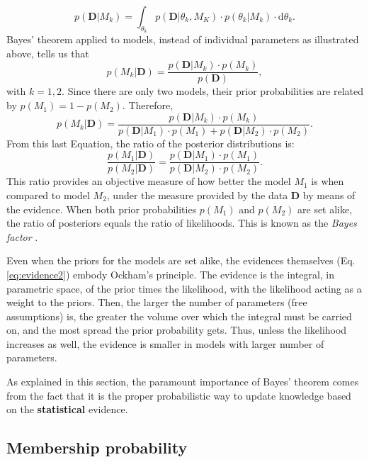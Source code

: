 \begin{equation}
p(\mathbf{D}|M_k)=\int_{\theta_k} p(\mathbf{D}|\theta_k,M_K)\cdot p(\theta_k|M_k)\cdot \mathrm{d}\theta_k. \label{eq:evidence2}
\end{equation}
Bayes' theorem applied to models, instead of individual parameters as illustrated above, tells us that
\begin{equation}
p(M_k|\mathbf{D})=\frac{p(\mathbf{D}|M_k)\cdot p(M_k)}{p(\mathbf{D})},
\end{equation}
with $k=1,2$. Since there are only two models, their prior probabilities are related by $p(M_1)= 1- p(M_2)$. Therefore,
 \begin{equation}
p(M_k|\mathbf{D})=\frac{p(\mathbf{D}|M_k)\cdot p(M_k)}{p(\mathbf{D}|M_1)\cdot p(M_1)+p(\mathbf{D}|M_2)\cdot p(M_2)}.
\end{equation}
From this last Equation, the ratio of the posterior distributions is:
\begin{equation}
\frac{p(M_1|\mathbf{D})}{p(M_2|\mathbf{D})}=\frac{p(\mathbf{D}|M_1)\cdot p(M_1)}{p(\mathbf{D}|M_2)\cdot p(M_2)}.
\end{equation}
This ratio provides an objective measure of how better the model $M_1$ is when compared to model $M_2$, under the measure provided by the data $\mathbf{D}$ by means of the evidence. When both prior probabilities  $p(M_1)$ and $p(M_2)$ are set alike, the ratio of posteriors equals the ratio of likelihoods. This is known as the \emph{Bayes factor} \cite[for a similar derivation and some examples of its application see][]{Kaas1995}. 

Even when the priors for the models are set alike, the evidences themselves (Eq. \ref{eq:evidence2}) embody Ockham's principle. The evidence is the integral, in parametric space, of the prior times the likelihood, with the likelihood acting as a weight to the priors.  Then, the larger the number of parameters (free assumptions) is, the greater the volume over which the integral must be carried on, and the most spread the prior probability gets. Thus, unless the likelihood increases as well, the evidence is smaller in models with larger number of parameters.

As explained in this section, the paramount importance of Bayes' theorem comes from the fact that it is the proper probabilistic way to update knowledge based on the \textbf{statistical} evidence.

\subsection{Membership probability}

